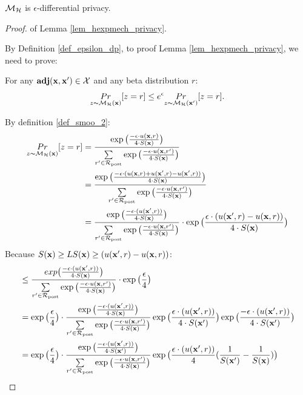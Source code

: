 \documentclass{article}
\begin{document}
\begin{lem}
\label{lem_hexpmech_privacy}
$\mathcal{M}_{\mathcal{H}}$ is $\epsilon$-differential privacy.
\end{lem}

\begin{proof} of Lemma \ref{lem_hexpmech_privacy}.

  By Definition \ref{def_epsilon_dp}, to proof Lemma \ref{lem_hexpmech_privacy}, we need to prove:

  For any $\textbf{adj}(\textbf{x},\textbf{x}') \in \mathcal{X}$ and any beta distribution $r$:
  \begin{equation*}
  \underset{z \thicksim \mathcal{M}_{\mathcal{H}}(\textbf{x})}{Pr}[z = r] \leq e^{\epsilon} \underset{z \thicksim \mathcal{M}_{\mathcal{H}}(\textbf{x}')}{Pr}[z = r]. 
  \end{equation*}


  By definition \ref{def_smoo_2}:
  \begin{equation*}
  \begin{split}
  \underset{z \thicksim \mathcal{M}_{\mathcal{H}}(\textbf{x})}{Pr}[z = r] 
  & = \frac {\exp\big(\frac{-\epsilon\cdot u(\textbf{x}, {r})}{4\cdot S(\textbf{x})}\big)}{\sum\limits_{r'\in \mathcal{R}_{\textup{post}}} \exp \big(\frac{-\epsilon\cdot u(\textbf{x}, r')}{4 \cdot S(\textbf{x})}\big)} \\
  & = \frac {\exp\big(
  \frac{-\epsilon\cdot(u(\textbf{x}, {r}) + u(\textbf{x}', {r}) - u(\textbf{x}', {r}))}{4\cdot S(\textbf{x})}
  \big)}
  {\sum\limits_{r'\in \mathcal{R}_{\textup{post}}} \exp \big(\frac{-\epsilon\cdot u(\textbf{x}, r')}{4 \cdot S(\textbf{x})}\big)} \\
  & = \frac {\exp\big(
  \frac{-\epsilon\cdot(u(\textbf{x}', {r}))}{4\cdot S(\textbf{x})}
  \big)}
  {\sum\limits_{r'\in \mathcal{R}_{\textup{post}}} \exp \big(\frac{-\epsilon\cdot u(\textbf{x}, r')}{4 \cdot S(\textbf{x})}\big)}
  \cdot \exp\big( \frac{\epsilon\cdot(u(\textbf{x}', {r}) - u(\textbf{x}, {r}))}{4\cdot S(\textbf{x})} \big)\\
  \end{split}
  \end{equation*}
  Because $S(\textbf{x}) \geq LS(\textbf{x}) \geq (u(\textbf{x}', {r}) - u(\textbf{x}, {r}))$:
  \begin{equation*}
  \begin{split}
  & \leq \frac {exp\big(
  \frac{-\epsilon\cdot(u(\textbf{x}', {r}))}{4\cdot S(\textbf{x})}
  \big)}
  {\sum\limits_{r'\in \mathcal{R}_{\textup{post}}} \exp \big(\frac{-\epsilon\cdot u(\textbf{x}, r')}{4 \cdot S(\textbf{x})}\big)}
  \cdot \exp\big( \frac{\epsilon}{4} \big) \\
  & = \exp\big( \frac{\epsilon}{4} \big) \cdot 
  \frac {
  \exp
  \big(
  \frac{-\epsilon\cdot(u(\textbf{x}', {r}))}{4\cdot S(\textbf{x})}
  \big)
  } 
  {\sum\limits_{r'\in \mathcal{R}_{\textup{post}}} \exp \big(\frac{-\epsilon\cdot u(\textbf{x}, r')}{4 \cdot S(\textbf{x})}\big)}
  \exp
  \big(
  \frac{\epsilon\cdot(u(\textbf{x}', {r}))}{4\cdot S(\textbf{x}')}
  \big)
  \exp
  \big(
  \frac{-\epsilon\cdot(u(\textbf{x}', {r}))}{4\cdot S(\textbf{x}')}
  \big)\\
  & = \exp\big( \frac{\epsilon}{4} \big) \cdot 
  \frac {
  \exp
  \big(
  \frac{-\epsilon\cdot(u(\textbf{x}', {r}))}{4\cdot S(\textbf{x}')}
  \big)
  } 
  {\sum\limits_{r'\in \mathcal{R}_{\textup{post}}} \exp \big(\frac{-\epsilon\cdot u(\textbf{x}, r')}{4 \cdot S(\textbf{x})}\big)}
  \exp
  \big(
  \frac{\epsilon\cdot(u(\textbf{x}', {r}))}{4}(\frac{1}{S(\textbf{x}')} - \frac{1}{S(\textbf{x})})
  \big)\\
  \end{split}
  \end{equation*}
  

\end{proof}
\end{document}
